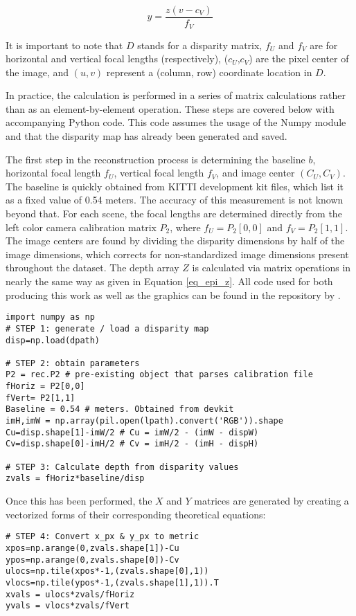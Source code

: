 \begin{equation}
y = \frac{z(v - c_V)}{f_V}
\end{equation}

It is important to note that $D$ stands for a disparity matrix, $f_U$ and $f_V$ are for horizontal and vertical focal lengths (respectively), ($c_U$,$c_V$) are the pixel center of the image, and $(u,v)$ represent a (column, row) coordinate location in $D$. 

In practice, the calculation is performed in a series of matrix calculations rather than as an element-by-element operation. These steps are covered below with accompanying Python code. This code assumes the usage of the Numpy module and that the disparity map has already been generated and saved.

The first step in the reconstruction process is determining the baseline $b$, horizontal focal length $f_U$, vertical focal length $f_V$, and image center $(C_U,C_V)$. The baseline is quickly obtained from KITTI development kit files, which list it as a fixed value of 0.54 meters. The accuracy of this measurement is not known beyond that. For each scene, the focal lengths are determined directly from the left color camera calibration matrix $P_2$, where $f_U=P_2[0,0]$ and $f_V=P_2[1,1]$. The image centers are found by dividing the disparity dimensions by half of the image dimensions, which corrects for non-standardized image dimensions present throughout the dataset. The depth array $Z$ is calculated via matrix operations in nearly the same way as given in Equation \ref{eq_epi_z}. All code used for both producing this work as well as the graphics can be found in the repository by \cite{gonzalez_smart3d_2019}. 

\begin{lstlisting}
import numpy as np
# STEP 1: generate / load a disparity map
disp=np.load(dpath)

# STEP 2: obtain parameters
P2 = rec.P2 # pre-existing object that parses calibration file
fHoriz = P2[0,0]
fVert= P2[1,1]
Baseline = 0.54 # meters. Obtained from devkit
imH,imW = np.array(pil.open(lpath).convert('RGB')).shape
Cu=disp.shape[1]-imW/2 # Cu = imW/2 - (imW - dispW)
Cv=disp.shape[0]-imH/2 # Cv = imH/2 - (imH - dispH)

# STEP 3: Calculate depth from disparity values
zvals = fHoriz*baseline/disp
\end{lstlisting}

Once this has been performed, the $X$ and $Y$ matrices are generated by creating a vectorized forms of their corresponding theoretical equations: 
\begin{lstlisting}
# STEP 4: Convert x_px & y_px to metric
xpos=np.arange(0,zvals.shape[1])-Cu
ypos=np.arange(0,zvals.shape[0])-Cv
ulocs=np.tile(xpos*-1,(zvals.shape[0],1))
vlocs=np.tile(ypos*-1,(zvals.shape[1],1)).T
xvals = ulocs*zvals/fHoriz
yvals = vlocs*zvals/fVert
\end{lstlisting}

